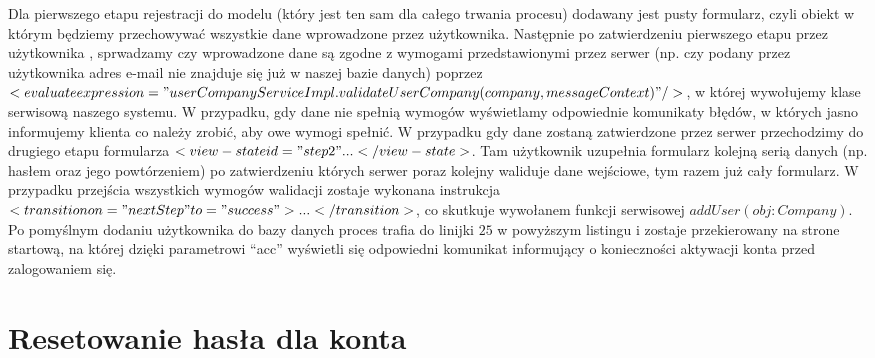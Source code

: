 Dla pierwszego etapu rejestracji do modelu (który jest ten sam dla całego trwania procesu) dodawany jest pusty formularz, czyli obiekt w którym będziemy przechowywać wszystkie dane wprowadzone przez użytkownika. Następnie po zatwierdzeniu pierwszego etapu przez użytkownika , sprwadzamy czy wprowadzone dane są zgodne z wymogami przedstawionymi przez serwer (np. czy podany przez użytkownika adres e-mail nie znajduje się już w naszej bazie danych) poprzez $<evaluate expression="userCompanyServiceImpl.validateUserCompany(company,messageContext)" />$,  w której wywołujemy klase serwisową naszego systemu. W przypadku, gdy dane nie spełnią wymogów wyświetlamy odpowiednie komunikaty błędów, w których jasno informujemy klienta co należy zrobić, aby owe wymogi spełnić. W przypadku gdy dane zostaną zatwierdzone przez serwer przechodzimy do drugiego etapu formularza  $<view-state id="step2" ... </view-state>$. Tam użytkownik uzupełnia formularz kolejną serią danych (np. hasłem oraz jego powtórzeniem) po zatwierdzeniu których serwer poraz kolejny waliduje dane wejściowe, tym razem już cały formularz. W przypadku przejścia wszystkich wymogów walidacji zostaje wykonana instrukcja $<transition on="nextStep" to="success">...</transition>$, co skutkuje wywołanem funkcji serwisowej $addUser(obj: Company)$. Po pomyślnym dodaniu użytkownika do bazy danych proces trafia do linijki $25$ w powyższym listingu i zostaje przekierowany na strone startową, na której dzięki parametrowi ``acc'' wyświetli się odpowiedni komunikat informujący o konieczności aktywacji konta przed zalogowaniem się.


\section{Resetowanie hasła dla konta}
